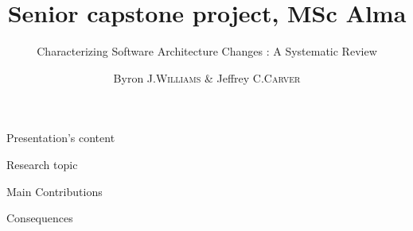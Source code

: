 \documentclass[HeilHazel,pdf,final,colorBG,slideColor]{prosper}
\title{\vspace{-0,5cm}Senior capstone project, MSc Alma}
\subtitle{Characterizing Software Architecture Changes : A Systematic Review}
\author{Byron J.\textsc{Williams} \& Jeffrey C.\textsc{Carver}}
\begin{document}
\maketitle
\newcommand{\bc}{\begin{center}} 
\newcommand{\ec}{\end{center}} 
\newcommand{\bi}{\begin{Itemize}} 
\newcommand{\ei}{\end{Itemize}} 
\newcommand{\myitemm}{\item \texttt{[image: green-bullet-on-white]}}


\begin{slide}[Box]{Presentation's content}
  \begin{enumerate}
    {\bf
    \item Research topic \hfill \\
      \vspace{1,5cm}
    \item  Main Contributions
      \vspace{1,5cm}
    \item Consequences}
  \end{enumerate}
\end{slide}




\end{document}
